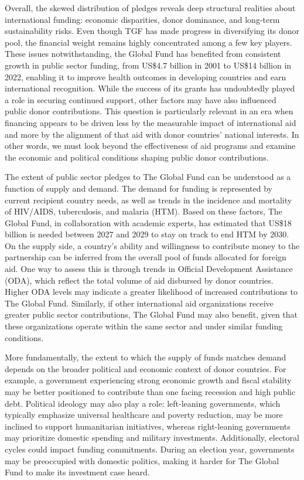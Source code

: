 \documentclass[
]{article}
\begin{document}
Overall, the skewed distribution of pledges reveals deep structural
realities about international funding: economic disparities, donor
dominance, and long-term sustainability risks. Even though TGF has made
progress in diversifying its donor pool, the financial weight remains
highly concentrated among a few key players. These issues
notwithstanding, the Global Fund has benefited from consistent growth in
public sector funding, from US\$4.7 billion in 2001 to US\$14 billion in
2022, enabling it to improve health outcomes in developing countries and
earn international recognition. While the success of its grants has
undoubtedly played a role in securing continued support, other factors
may have also influenced public donor contributions. This question is
particularly relevant in an era when financing appears to be driven less
by the measurable impact of international aid and more by the alignment
of that aid with donor countries' national interests. In other words, we
must look beyond the effectiveness of aid programs and examine the
economic and political conditions shaping public donor contributions.

The extent of public sector pledges to The Global Fund can be understood
as a function of supply and demand. The demand for funding is
represented by current recipient country needs, as well as trends in the
incidence and mortality of HIV/AIDS, tuberculosis, and malaria (HTM).
Based on these factors, The Global Fund, in collaboration with academic
experts, has estimated that US\$18 billion is needed between 2027 and
2029 to stay on track to end HTM by 2030. On the supply side, a
country's ability and willingness to contribute money to the partnership
can be inferred from the overall pool of funds allocated for foreign
aid. One way to assess this is through trends in Official Development
Assistance (ODA), which reflect the total volume of aid disbursed by
donor countries. Higher ODA levels may indicate a greater likelihood of
increased contributions to The Global Fund. Similarly, if other
international aid organizations receive greater public sector
contributions, The Global Fund may also benefit, given that these
organizations operate within the same sector and under similar funding
conditions.

More fundamentally, the extent to which the supply of funds matches
demand depends on the broader political and economic context of donor
countries. For example, a government experiencing strong economic growth
and fiscal stability may be better positioned to contribute than one
facing recession and high public debt. Political ideology may also play
a role: left-leaning governments, which typically emphasize universal
healthcare and poverty reduction, may be more inclined to support
humanitarian initiatives, whereas right-leaning governments may
prioritize domestic spending and military investments. Additionally,
electoral cycles could impact funding commitments. During an election
year, governments may be preoccupied with domestic politics, making it
harder for The Global Fund to make its investment case heard.
\end{document}
